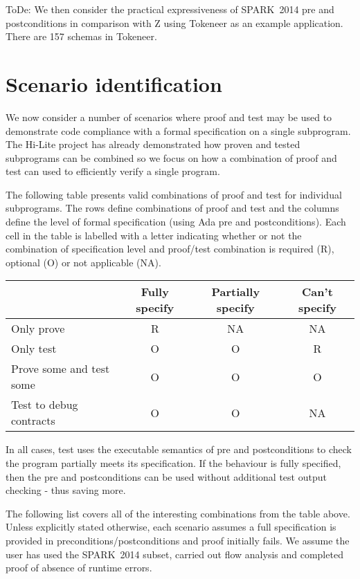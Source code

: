 \documentclass{llncs}
\newcommand{\newspark}{SPARK~2014\xspace}
\begin{document}
ToDe: We then consider the practical expressiveness of \newspark pre
and postconditions in comparison with Z using Tokeneer as an example
application. There are 157 schemas in Tokeneer.


\section{Scenario identification}

We now consider a number of scenarios where proof and test may be used
to demonstrate code compliance with a formal specification on a single
subprogram. The Hi-Lite project has already demonstrated
\cite{hiliteERTS2012} how proven and tested subprograms can be
combined so we focus on how a combination of proof and test can used
to efficiently verify a single program.

The following table presents valid combinations of proof and test for
individual subprograms. The rows define combinations of proof and test
and the columns define the level of formal specification (using Ada
pre and postconditions). Each cell in the table is labelled with a
letter indicating whether or not the combination of specification
level and proof/test combination is required (R), optional (O) or not
applicable (NA).

\begin{center}
\begin{tabular}{l | c | c | c}
    & Fully specify & Partially specify & Can't specify \\
  \hline
  Only prove & R & NA & NA \\
  Only test & O & O & R \\
  Prove some and test some & O & O & O \\
  Test to debug contracts & O & O & NA \\
\end{tabular}
\end{center}

In all cases, test uses the executable semantics of pre and
postconditions to check the program partially meets its specification.
If the behaviour is fully specified, then the pre and postconditions
can be used without additional test output checking - thus saving
more.

The following list covers all of the interesting combinations from the
table above. Unless explicitly stated otherwise, each scenario assumes
a full specification is provided in preconditions/postconditions and
proof initially fails. We assume the user has used the \newspark
subset, carried out flow analysis and completed proof of absence of
runtime errors.
\end{document}
